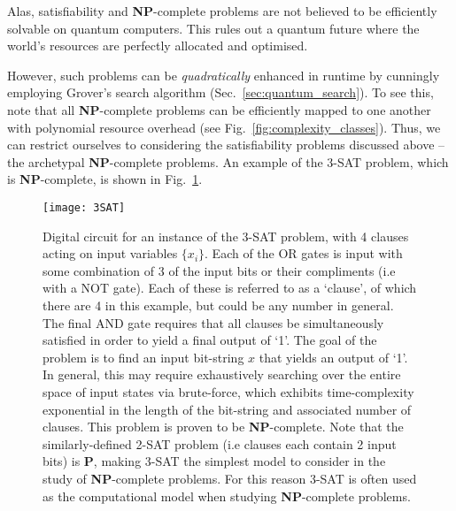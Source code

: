 

Alas, satisfiability and \textbf{NP}-complete problems are not believed to be efficiently solvable on quantum computers. This rules out a quantum future where the world's resources are perfectly allocated and optimised.

However, such problems can be \textit{quadratically} enhanced in runtime by cunningly employing Grover's search algorithm (Sec.~\ref{sec:quantum_search}). To see this, note that all \textbf{NP}-complete problems can be efficiently mapped to one another with polynomial resource overhead (see Fig.~\ref{fig:complexity_classes}). Thus, we can restrict ourselves to considering the satisfiability problems discussed above -- the archetypal \textbf{NP}-complete problems. An example of the 3-\textsc{SAT} problem, which is \textbf{NP}-complete, is shown in Fig.~\ref{fig:3SAT}.

\begin{figure}[!htb]
\texttt{[image: 3SAT]}
\caption{Digital circuit for an instance of the 3-\textsc{SAT} problem, with 4 clauses acting on input variables $\{x_i\}$. Each of the OR gates is input with some combination of 3 of the input bits or their compliments (i.e with a NOT gate). Each of these is referred to as a `clause', of which there are 4 in this example, but could be any number in general. The final AND gate requires that all clauses be simultaneously satisfied in order to yield a final output of `1'. The goal of the problem is to find an input bit-string $x$ that yields an output of `1'. In general, this may require exhaustively searching over the entire space of input states via brute-force, which exhibits time-complexity exponential in the length of the bit-string and associated number of clauses. This problem is proven to be \textbf{NP}-complete. Note that the similarly-defined 2-\textsc{SAT} problem (i.e clauses each contain 2 input bits) is \textbf{P}, making 3-\textsc{SAT} the simplest model to consider in the study of \textbf{NP}-complete problems. For this reason 3-\textsc{SAT} is often used as the computational model when studying \textbf{NP}-complete problems.} \label{fig:3SAT}	
\end{figure}

